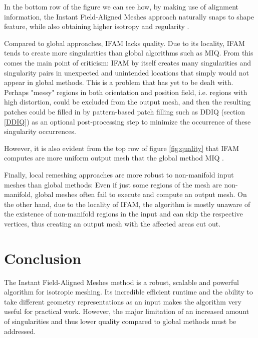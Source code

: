 \documentclass{ACGSeminar}
\begin{document}
In the bottom row of the figure we can see how, by making use of alignment information, the Instant Field-Aligned Meshes approach naturally snaps to shape feature, while also obtaining higher isotropy and regularity \cite{jakob2015instant}.

Compared to global approaches, IFAM lacks quality. Due to its locality, IFAM tends to create more singularities than global algorithms such as MIQ. From this comes the main point of criticism: IFAM by itself creates many singularities and singularity pairs in unexpected and unintended locations that simply would not appear in global methods. This is a problem that has yet to be dealt with. Perhaps "messy" regions in both orientation and position field, i.e. regions with high distortion, could be excluded from the output mesh, and then the resulting patches could be filled in by pattern-based patch filling such as DDIQ (section \ref{DDIQ}) as an optional post-processing step to minimize the occurrence of these singularity occurrences.

However, it is also evident from the top row of figure \ref{fig:quality} that IFAM computes are more uniform output mesh that the global method MIQ \cite{jakob2015instant}.\bigskip

Finally, local remeshing approaches are more robust to non-manifold input meshes than global methods: Even if just some regions of the mesh are non-manifold, global meshes often fail to execute and compute an output mesh. On the other hand, due to the locality of IFAM, the algorithm is mostly unaware of the existence of non-manifold regions in the input and can skip the respective vertices, thus creating an output mesh with the affected areas cut out.

\section{Conclusion}
The Instant Field-Aligned Meshes method is a robust, scalable and powerful algorithm for isotropic meshing. Its incredible efficient runtime and the ability to take different geometry representations as an input makes the algorithm very useful for practical work. However, the major limitation of an increased amount of singularities and thus lower quality compared to global methods must be addressed.\bigskip
\end{document}
